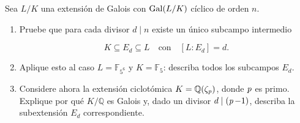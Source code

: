 \begin{ejer}
Sea $L/K$ una extensión de Galois con $\operatorname{Gal}(L/K)$ cíclico de orden $n$.

\begin{enumerate}[label=\alph*)]
\item Pruebe que para cada divisor $d \mid n$ existe un único subcampo intermedio

\[
K \subseteq E_d \subseteq L \quad \text{con} \quad [L : E_d] = d.
\]

\item Aplique esto al caso $L = \mathbb{F}_{5^6}$ y $K = \mathbb{F}_5$: describa todos los subcampos $E_d$.

\item Considere ahora la extensión ciclotómica $K = \mathbb{Q}(\zeta_{\operatorname{\textit{p}}})$, donde $\operatorname{\textit{p}}$ es primo. Explique por qué $K/\mathbb{Q}$ es Galois y, dado un divisor $d \mid (\operatorname{\textit{p}}-1)$, describa la subextensión $E_d$ correspondiente.
\end{enumerate}
\end{ejer}
